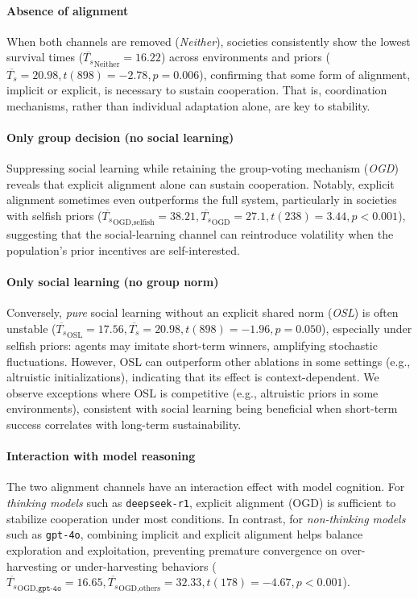 \documentclass[sigconf]{aamas}
\begin{document}
\paragraph{Absence of alignment}
When both channels are removed (\textit{Neither}), societies consistently show the lowest survival times ($\overline{T_s}_{\text{Neither}} = 16.22$) across environments and priors ($\overline{T_s} = 20.98, t\left(898\right) = -2.78, p = 0.006$), confirming that some form of alignment, implicit or explicit, is necessary to sustain cooperation. 
That is, coordination mechanisms, rather than individual adaptation alone, are key to stability.

\paragraph{Only group decision (no social learning)}
Suppressing social learning while retaining the group-voting mechanism (\textit{OGD}) reveals that explicit alignment alone can sustain cooperation. 
Notably, explicit alignment sometimes even outperforms the full system, particularly in societies with selfish priors ($\overline{T_s}_{\text{OGD}, \text{selfish}} = 38.21, \overline{T_s}_{\text{OGD}} = 27.1, t\left(238\right) = 3.44, p < 0.001$), suggesting that the social-learning channel can reintroduce volatility when the population’s prior incentives are self-interested.

\paragraph{Only social learning (no group norm)}
Conversely, \emph{pure} social learning without an explicit shared norm (\textit{OSL}) is often unstable ($\overline{T_s}_{\text{OSL}} = 17.56, \overline{T_s} = 20.98, t\left(898\right)= -1.96, p = 0.050$), especially under selfish priors: agents may imitate short-term winners, amplifying stochastic fluctuations.
However, OSL can outperform other ablations in some settings (e.g., altruistic initializations), indicating that its effect is context-dependent.
We observe exceptions where OSL is competitive (e.g., altruistic priors in some environments), consistent with social learning being beneficial when short-term success correlates with long-term sustainability.

\paragraph{Interaction with model reasoning}
The two alignment channels have an interaction effect with model cognition. 
For \emph{thinking models} such as \texttt{deepseek-r1}, explicit alignment (OGD) is sufficient to stabilize cooperation under most conditions.
In contrast, for \emph{non-thinking models} such as \texttt{gpt-4o}, combining implicit and explicit alignment helps balance exploration and exploitation, preventing premature convergence on over-harvesting or under-harvesting behaviors ($\overline{T_s}_{\text{OGD}, \texttt{gpt-4o}} = 16.65, \overline{T_s}_{\text{OGD}, \text{others}} = 32.33, t\left(178\right) = -4.67, p < 0.001$). 
\end{document}
